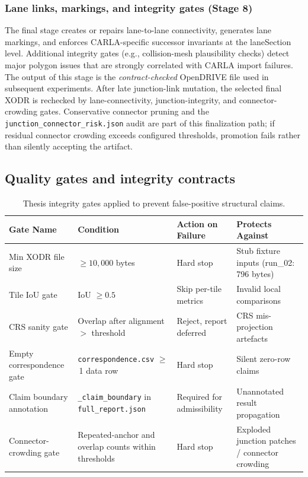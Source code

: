 \subsubsection{Lane links, markings, and integrity gates (Stage 8)}
The final stage creates or repairs lane-to-lane connectivity, generates lane markings, and enforces CARLA-specific successor invariants at the laneSection level. Additional integrity gates (e.g., collision-mesh plausibility checks) detect major polygon issues that are strongly correlated with CARLA import failures. The output of this stage is the \emph{contract-checked} OpenDRIVE file used in subsequent experiments.
After late junction-link mutation, the selected final XODR is rechecked by lane-connectivity, junction-integrity, and connector-crowding gates. Conservative connector pruning and the \texttt{junction\_connector\_risk.json} audit are part of this finalization path; if residual connector crowding exceeds configured thresholds, promotion fails rather than silently accepting the artifact.

\subsection{Quality gates and integrity contracts}
\begin{table}[htbp]
\centering
\small
\begin{tabular}{p{3.0cm}p{3.4cm}p{3.0cm}p{4.2cm}}
\hline
Gate Name & Condition & Action on Failure & Protects Against \\
\hline
Min XODR file size & $\geq 10{,}000$ bytes & Hard stop & Stub fixture inputs (run\_02: 796 bytes) \\
Tile IoU gate & IoU $\geq 0.5$ & Skip per-tile metrics & Invalid local comparisons \\
CRS sanity gate & Overlap after alignment $>$ threshold & Reject, report deferred & CRS mis-projection artefacts \\
Empty correspondence gate & \texttt{correspondence.csv} $\geq$\,1 data row & Hard stop & Silent zero-row claims \\
Claim boundary annotation & \texttt{\_claim\_boundary} in \mbox{\texttt{full\_report.json}} & Required for admissibility & Unannotated result propagation \\
Connector-crowding gate & Repeated-anchor and overlap counts within thresholds & Hard stop & Exploded junction patches / connector crowding \\
\hline
\end{tabular}
\caption{Thesis integrity gates applied to prevent false-positive structural claims.}
\label{tab:quality_gates_contract}
\end{table}

